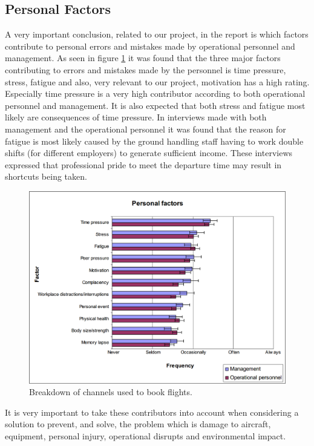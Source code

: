 \subsection{Personal Factors} %
A very important conclusion, related to our project, in the report is which factors contribute to personal errors and mistakes made by operational personnel and management. As seen in figure \ref{PersonalFactors} it was found that the three major factors contributing to errors and mistakes made by the personnel is time pressure, stress, fatigue and also, very relevant to our project, motivation has a high rating. Especially time pressure is a very high contributor according to both operational personnel and management. It is also expected that both stress and fatigue most likely are consequences of time pressure. In interviews made with both management and the operational personnel it was found that the reason for fatigue is most likely caused by the ground handling staff having to work double shifts (for different employers) to generate sufficient income. These interviews expressed that professional pride to meet the departure time may result in shortcuts being taken.

\begin{figure}[H]
\centering
\includegraphics[width=\textwidth]{Grafik/PersonalFactors}
\caption{Breakdown of channels used to book flights.}
\label{PersonalFactors}
\end{figure}

It is very important to take these contributors into account when considering a solution to prevent, and solve, the problem which is damage to aircraft, equipment, personal injury, operational disrupts and environmental impact.

